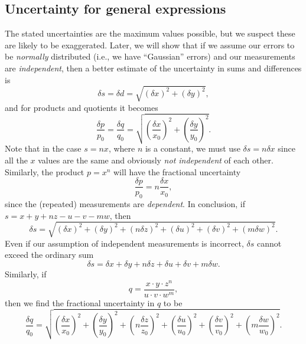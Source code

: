 \subsection{Uncertainty for general expressions}
The stated uncertainties are the maximum values possible, but we suspect these are likely to be exaggerated.
Later, we will show that if we assume our errors to be \emph{normally} distributed (i.e., we have 
``Gaussian'' errors) and our measurements are \emph{independent}, then a better estimate of the uncertainty in 
sums and differences is 
\begin{equation}
\delta s = \delta d = \sqrt{ (\delta x)^2 + (\delta y) ^2},
\end{equation}
	and for products and quotients it becomes
\begin{equation}
\frac{\delta p }{p_0} = \frac{\delta q}{q_0} = 
\sqrt{ \left (  \frac{\delta x}{x_0} \right)^2 + \left( \frac{\delta y}{y_0}  \right)^2 }.
\end{equation}	 
Note that in the case $s = nx$, where $n$ is a constant, we must use $\delta s = n\delta x$ since all the $x$ values are the 
same and obviously \emph{not independent} of each other.  Similarly, the product $p = x^n$ will have the 
fractional uncertainty
\begin{equation}
\frac{\delta p }{p_0} = n \frac{\delta x}{x_0},
\label{eq:poweruncertainty}
\end{equation}
since the (repeated) measurements are \emph{dependent}.  In conclusion, if $s = x + y + nz - u - v - mw$, then
\begin{equation}
\delta s = \sqrt{ (\delta x)^2 + (\delta y)^2 + (n \delta z)^2 +(\delta u)^2 + (\delta v)^2
+ (m \delta w)^2    }.
\end{equation}
Even if our assumption of independent measurements is incorrect, $\delta s$ cannot exceed 
the ordinary sum
\begin{equation}
\delta s = \delta x + \delta y + n \delta z + \delta u + \delta v + m \delta  w.
\label{eq:uncert_sum}
\end{equation}
Similarly, if
\begin{equation}
q = \frac{x \cdot y \cdot z^n}{u \cdot v \cdot w ^m},
\end{equation}
then we find the fractional uncertainty in $q$ to be
\begin{equation}
\frac{\delta q }{q_0} = \sqrt{ \left ( \frac{\delta x}{x_0}   \right )^2 +
\left ( \frac{\delta y}{y_0}   \right )^2 + 
\left ( n \frac{\delta z}{z_0}   \right )^2 + \left ( \frac{\delta u}{u_0}   \right )^2  + \left ( \frac{\delta v}{v_0}   \right ) ^2 + 
\left ( m \frac{\delta w}{w_0}   \right )^2         }.
\label{eq:uncert_prod}
\end{equation}

